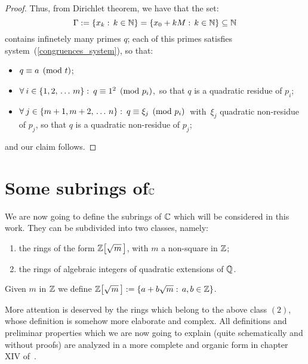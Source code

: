 \begin{proof}
Thus, from Dirichlet theorem, we have that the set:
$$
\Gamma:= \left\{x_k:\, k \in \mathbb{N}\right\} =
\left\{x_0 + kM:\, k \in \mathbb{N}\right\} \subseteq \mathbb{N}
$$
contains infinetely many primes $q$; each of this primes
satisfies system~(\ref{congruences_system}), so that:
%
\begin{itemize}
%
\item
$q \equiv a \pmod t$;
%
\item $\forall\:i \in \{1, 2,\,\ldots\, m\}:\:q \equiv
1^2 \pmod{p_i}$,\, so that $q$ is a quadratic residue of
$p_i$;
%
\item $\forall\:j \in \{m+1, m+2,\,\ldots\, n\}:\:q \equiv
\xi_j \pmod{p_i}$\, with\, $\xi_j$ quadratic non-residue
of $p_j$, so that $q$ is a quadratic non-residue of $p_j$;
%
\end{itemize}
%
and our claim follows.
\end{proof}


\section{Some subrings of\enskip$\mathbb{C}$}\label{C_subrings}

We are now going to define the subrings of $\mathbb{C}$ which
will be considered in this work. They can be subdivided
into two classes, namely:

\begin{enumerate}
 \item the rings of the form $\ZZ{m}$, with $m$ a
       non-square in $\mathbb{Z}$;
 \item the rings of algebraic integers of quadratic
       extensions of $\mathbb{Q}$.
\end{enumerate}

\begin{defn} Given $m$ in $\mathbb{Z}$ we define
$\ZZ{m} := \{ a + b\sqrt m:\, a,b \in \Z \}$.
\end{defn}
%

More attention is deserved by the rings which belong to the above class
$(2)$, whose definition is somehow more elaborate and complex.
All definitions and preliminar properties which we are now going to
explain (quite schematically and without proofs) are analyzed in a more
complete and organic form in chapter XIV of~\cite{H&W}.

